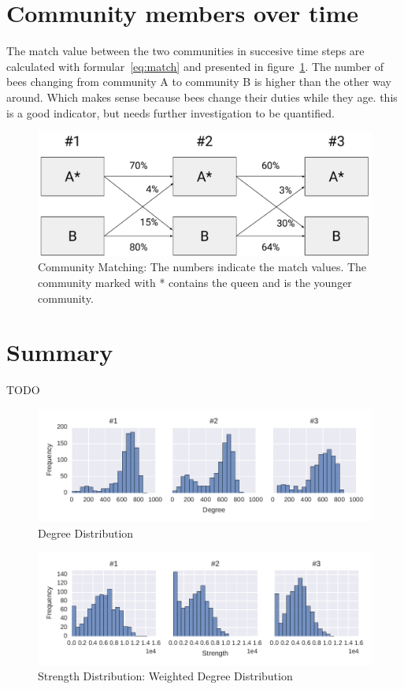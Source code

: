 \section{Community members over time}
 The match value between the two communities in succesive time steps are calculated with formular~\ref{eq:match} and presented in figure~\ref{fig:members}. The number of bees changing from community A to community B is higher than the other way around. Which makes sense because bees change their duties while they age. this is a good indicator, but needs further investigation to be quantified.

\begin{figure}[htb]
	\centering
	\includegraphics[width=.8\textwidth]{Figures/members}
	\caption[Community Matching]{Community Matching: The numbers indicate the match values. The community marked with * contains the queen and is the younger community.}
	\label{fig:members}
\end{figure}


\section{Summary}
TODO




\begin{figure}[htb]
	\centering
	\includegraphics[width=1.0\textwidth]{Figures/stat-degreeDist}
	\caption[Degree Distribution]{Degree Distribution}
	\label{fig:statDegreeDist}
\end{figure}


\begin{figure}[htb]
	\centering
	\includegraphics[width=1.0\textwidth]{Figures/stat-strengthDist}
	\caption[Strength Distribution]{Strength Distribution: Weighted Degree Distribution}
	\label{fig:statStrengthDist}
\end{figure}

